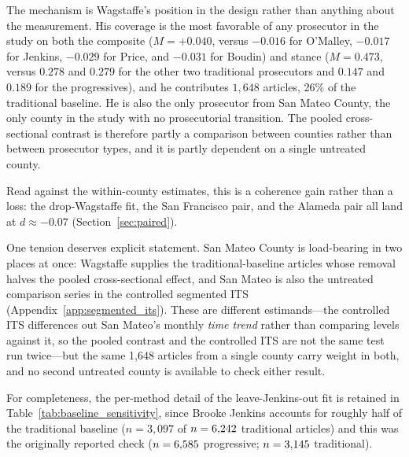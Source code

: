 \documentclass[12pt, letterpaper]{article}
\begin{document}
\begin{appendices}
The mechanism is Wagstaffe's position in the design rather than anything about the measurement. His coverage is the most favorable of any prosecutor in the study on both the composite ($M = +0.040$, versus $-0.016$ for O'Malley, $-0.017$ for Jenkins, $-0.029$ for Price, and $-0.031$ for Boudin) and stance ($M = 0.473$, versus $0.278$ and $0.279$ for the other two traditional prosecutors and $0.147$ and $0.189$ for the progressives), and he contributes $1{,}648$ articles, 26\% of the traditional baseline. He is also the only prosecutor from San Mateo County, the only county in the study with no prosecutorial transition. The pooled cross-sectional contrast is therefore partly a comparison between counties rather than between prosecutor types, and it is partly dependent on a single untreated county.

Read against the within-county estimates, this is a coherence gain rather than a loss: the drop-Wagstaffe fit, the San Francisco pair, and the Alameda pair all land at $d \approx -0.07$ (Section~\ref{sec:paired}).

One tension deserves explicit statement. San Mateo County is load-bearing in two places at once: Wagstaffe supplies the traditional-baseline articles whose removal halves the pooled cross-sectional effect, and San Mateo is also the untreated comparison series in the controlled segmented ITS (Appendix~\ref{app:segmented_its}). These are different estimands---the controlled ITS differences out San Mateo's monthly \emph{time trend} rather than comparing levels against it, so the pooled contrast and the controlled ITS are not the same test run twice---but the same 1{,}648 articles from a single county carry weight in both, and no second untreated county is available to check either result.

For completeness, the per-method detail of the leave-Jenkins-out fit is retained in Table~\ref{tab:baseline_sensitivity}, since Brooke Jenkins accounts for roughly half of the traditional baseline ($n=3{,}097$ of $n=6{,}242$ traditional articles) and this was the originally reported check ($n=6{,}585$ progressive; $n=3{,}145$ traditional).


\end{appendices}
\end{document}

